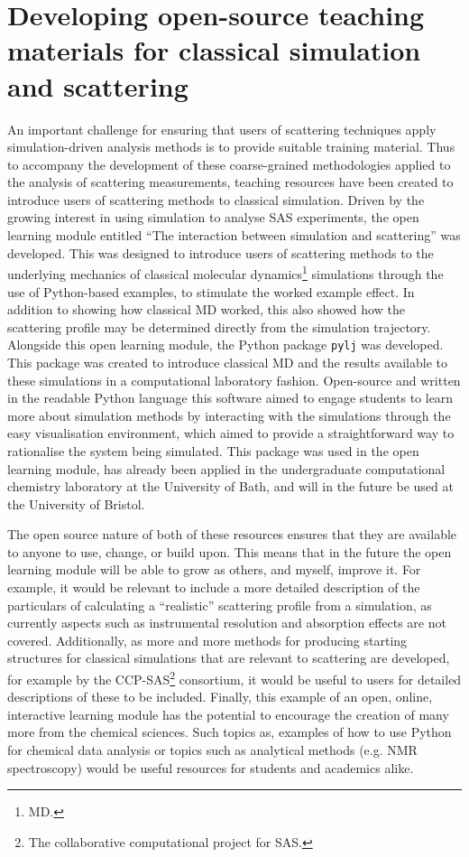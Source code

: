 \section{Developing open-source teaching materials for classical simulation and scattering}
An important challenge for ensuring that users of scattering techniques apply simulation-driven analysis methods is to provide suitable training material.
Thus to accompany the development of these coarse-grained methodologies applied to the analysis of scattering measurements, teaching resources have been created to introduce users of scattering methods to classical simulation.
Driven by the growing interest in using simulation to analyse SAS experiments,\autocite{hub_interpreting_2018,perkins_atomistic_2016} the open learning module entitled ``The interaction between simulation and scattering'' was developed.\autocite{mccluskey_introduction_20193,mccluskey_pythoninchemistry/sim_and_scat_2019}
This was designed to introduce users of scattering methods to the underlying mechanics of classical molecular dynamics\footnote{MD.} simulations through the use of Python-based examples, to stimulate the worked example effect.
In addition to showing how classical MD worked, this also showed how the scattering profile may be determined directly from the simulation trajectory.
Alongside this open learning module, the Python package \texttt{pylj} was developed.\autocite{mccluskey_pylj_2018,mccluskey_arm61/pylj_2019-2}
This package was created to introduce classical MD and the results available to these simulations in a computational laboratory fashion.
Open-source and written in the readable Python language this software aimed to engage students to learn more about simulation methods by interacting with the simulations through the easy visualisation environment, which aimed to provide a straightforward way to rationalise the system being simulated.
This package was used in the open learning module, has already been applied in the undergraduate computational chemistry laboratory at the University of Bath, and will in the future be used at the University of Bristol.

The open source nature of both of these resources ensures that they are available to anyone to use, change, or build upon.
This means that in the future the open learning module will be able to grow as others, and myself, improve it.
For example, it would be relevant to include a more detailed description of the particulars of calculating a ``realistic'' scattering profile from a simulation, as currently aspects such as instrumental resolution and absorption effects are not covered.
Additionally, as more and more methods for producing starting structures for classical simulations that are relevant to scattering are developed, for example by the CCP-SAS\footnote{The collaborative computational project for SAS.} consortium, it would be useful to users for detailed descriptions of these to be included.
Finally, this example of an open, online, interactive learning module has the potential to encourage the creation of many more from the chemical sciences.
Such topics as, examples of how to use Python for chemical data analysis or topics such as analytical methods (e.g. NMR spectroscopy) would be useful resources for students and academics alike.

